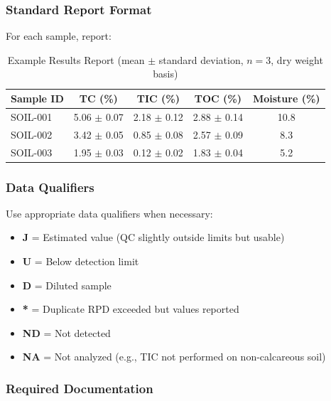 \documentclass[11pt,a4paper]{article}\usepackage[]{graphicx}\usepackage[]{xcolor}
\begin{document}
\subsubsection{Standard Report Format}

For each sample, report:

\begin{table}[h]
\centering
\small
\begin{tabular}{lcccc}
\toprule
\textbf{Sample ID} & \textbf{TC (\%)} & \textbf{TIC (\%)} & \textbf{TOC (\%)} & \textbf{Moisture (\%)} \\
\midrule
SOIL-001 & 5.06 $\pm$ 0.07 & 2.18 $\pm$ 0.12 & 2.88 $\pm$ 0.14 & 10.8 \\
SOIL-002 & 3.42 $\pm$ 0.05 & 0.85 $\pm$ 0.08 & 2.57 $\pm$ 0.09 & 8.3 \\
SOIL-003 & 1.95 $\pm$ 0.03 & 0.12 $\pm$ 0.02 & 1.83 $\pm$ 0.04 & 5.2 \\
\bottomrule
\end{tabular}
\caption{Example Results Report (mean $\pm$ standard deviation, $n=3$, dry weight basis)}
\end{table}

\subsubsection{Data Qualifiers}

Use appropriate data qualifiers when necessary:

\begin{itemize}[noitemsep]
    \item \textbf{J} = Estimated value (QC slightly outside limits but usable)
    \item \textbf{U} = Below detection limit
    \item \textbf{D} = Diluted sample
    \item \textbf{*} = Duplicate RPD exceeded but values reported
    \item \textbf{ND} = Not detected
    \item \textbf{NA} = Not analyzed (e.g., TIC not performed on non-calcareous soil)
\end{itemize}

\subsubsection{Required Documentation}
\end{document}
